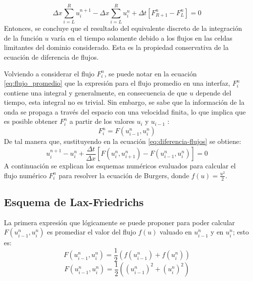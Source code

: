 \documentclass[12pt]{article}
\begin{document}
	\begin{equation}
		{\Delta x}\sum_{i=L}^{R} u_{i}^{n+1} - {\Delta x}\sum_{i=L}^{R}  u_{i}^{n} + {\Delta t}\left[ F_{R+1}^{n} - F_{L}^{n} \right] =0
	\end{equation}
	Entonces, se concluye que el resultado del equivalente discreto de la integración de la función $u$ varía en el tiempo solamente debido a los flujos en las celdas limitantes del dominio considerado. Esta es la propiedad conservativa de la ecuación de diferencia de flujos.
	
	Volviendo a considerar el flujo $F_{i}^{n}$, se puede notar en la ecuación \ref{eq:flujo_promedio} que la expresión para el flujo promedio en una interfaz, $F_{i}^{n}$ contiene una integral y generalmente, en consecuencia de que $u$ depende del tiempo, esta integral no es trivial. Sin embargo, se sabe que la información de la onda se propaga a través del espacio con una velocidad finita, lo que implica que es posible obtener $F_{i}^{n}$ a partir de los valores $u_i$ y $u_{i-1}$ \cite{LeVeque1998}:
	\begin{equation}
		F_{i}^{n} = F(u_{i-1}^{n}, u_{i}^{n})
	\end{equation}
	De tal manera que, sustituyendo en la ecuación \ref{eq:diferencia-flujos} se obtiene:
	\begin{equation}
		u_{i}^{n+1} - u_{i}^{n} + \frac{\Delta t}{\Delta x}\left[ F(u_{i}^{n}, u_{i+1}^{n}) - F(u_{i-1}^{n}, u_{i}^{n})\right] = 0
		\label{eq:flux-diff}
	\end{equation}
	A continuación se explican los esquemas numéricos evaluados para calcular el flujo numérico $F_{i}^{n}$ para resolver la ecuación de Burgers, donde $f(u)=\frac{u^2}{2}$.
	
	\subsection{Esquema de Lax-Friedrichs}
	La primera expresión que lógicamente se puede proponer para poder calcular $F(u_{i-1}^{n}, u_{i}^{n})$ es promediar el valor del flujo $f(u)$ valuado en $u_{i-1}^{n}$ y en $u_{i}^{n}$; esto es:
	\begin{equation}
		F(u_{i-1}^{n}, u_{i}^{n}) = \frac{1}{2} \left( f(u_{i-1}^{n}) + f(u_{i}^{n})\right) 
	\end{equation}
	\begin{equation}
		F(u_{i-1}^{n}, u_{i}^{n}) = \frac{1}{2} \left( (u_{i-1}^{n})^2 + (u_{i}^{n})^2 \right) 
	\end{equation}
	
\end{document}
